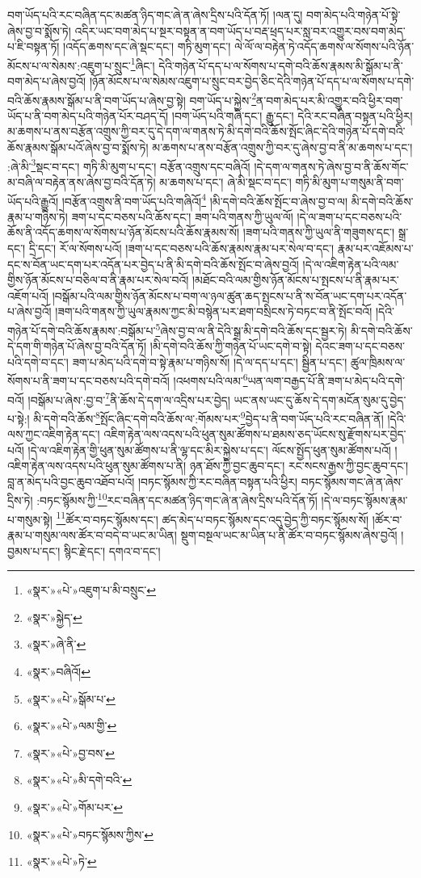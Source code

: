བག་ཡོད་པའི་རང་བཞིན་དང་མཚན་ཉིད་གང་ཞེ་ན་ཞེས་དྲིས་པའི་དོན་ཏོ། །ལན་དུ། བག་མེད་པའི་གཉེན་པོ་སྟེ་ཞེས་བྱ་བ་སྨོས་ཏེ། འདིར་ཡང་བག་མེད་པ་སྔར་བསྟན་ན་བག་ཡོད་པ་བརྡ་ཕྲད་པར་སླ་བར་འགྱུར་བས་བག་མེད་པ་ཇི་བསྟན་ཏོ། །འདོད་ཆགས་དང་ཞེ་སྡང་དང་། གཏི་མུག་དང་། ལེ་ལོ་ལ་བརྟེན་ཏེ་འདོད་ཆགས་ལ་སོགས་པའི་ཉོན་མོངས་པ་ལ་སེམས་:འཇུག་པ་སྲུང་\footnote{«སྣར་»«པེ་»འཇུག་པ་མི་བསྲུང་}ཞིང་། དེའི་གཉེན་པོ་དད་པ་ལ་སོགས་པ་དགེ་བའི་ཆོས་རྣམས་མི་སྒོམ་པ་ནི་བག་མེད་པ་ཞེས་བྱའོ། །ཉོན་མོངས་པ་ལ་སེམས་འཇུག་པ་སྲུང་བར་བྱེད་ཅིང་དེའི་གཉེན་པོ་དད་པ་ལ་སོགས་པ་དགེ་བའི་ཆོས་རྣམས་སྒོམ་པ་ནི་བག་ཡོད་པ་ཞེས་བྱ་སྟེ། བག་ཡོད་པ་སྐྱེས་\footnote{«སྣར་»སྐྱེད་}ན་བག་མེད་པར་མི་འགྱུར་བའི་ཕྱིར་བག་ཡོད་པ་ནི་བག་མེད་པའི་གཉེན་པོར་བཤད་དོ། །བག་ཡོད་པའི་གཞི་དང་། རྒྱུ་དང་། དེའི་རང་བཞིན་བསྟན་པའི་ཕྱིར། མ་ཆགས་པ་ནས་བརྩོན་འགྲུས་ཀྱི་བར་དུ་དེ་དག་ལ་གནས་ཏེ་མི་དགེ་བའི་ཆོས་སྤོང་ཞིང་དེའི་གཉེན་པོ་དགེ་བའི་ཆོས་རྣམས་སྒོམ་པའོ་ཞེས་བྱ་བ་སྨོས་ཏེ། མ་ཆགས་པ་ནས་བརྩོན་འགྲུས་ཀྱི་བར་དུ་ཞེས་བྱ་བ་ནི་མ་ཆགས་པ་དང་། :ཞེ་མི་\footnote{«སྣར་»ཞེ་ནི་}སྡང་བ་དང་། གཏི་མི་མུག་པ་དང་། བརྩོན་འགྲུས་དང་བཞིའོ། །དེ་དག་ལ་གནས་ཏེ་ཞེས་བྱ་བ་ནི་ཆོས་གོང་མ་བཞི་ལ་བརྟེན་ནས་ཞེས་བྱ་བའི་དོན་ཏེ། མ་ཆགས་པ་དང་། ཞེ་མི་སྡང་བ་དང་། གཏི་མི་མུག་པ་གསུམ་ནི་བག་ཡོད་པའི་རྒྱུའོ། །བརྩོན་འགྲུས་ནི་བག་ཡོད་པའི་གཞིའོ།\footnote{«སྣར་»བཞིའོ།} །མི་དགེ་བའི་ཆོས་སྤོང་བ་ཞེས་བྱ་བ་ལ། མི་དགེ་བའི་ཆོས་རྣམ་པ་གཉིས་ཏེ། ཟག་པ་དང་བཅས་པའི་ཆོས་དང་། ཟག་པའི་གནས་ཀྱི་ཡུལ་ལོ། །དེ་ལ་ཟག་པ་དང་བཅས་པའི་ཆོས་ནི་འདོད་ཆགས་ལ་སོགས་པ་ཉོན་མོངས་པའི་ཆོས་རྣམས་སོ། །ཟག་པའི་གནས་ཀྱི་ཡུལ་ནི་གཟུགས་དང་། སྒྲ་དང་། དྲི་དང་། རོ་ལ་སོགས་པའོ། །ཟག་པ་དང་བཅས་པའི་ཆོས་རྣམས་རྣམ་པར་སེལ་བ་དང་། རྣམ་པར་འཇོམས་པ་དང་ས་བོན་ཡང་དག་པར་འདོན་པར་བྱེད་པ་ནི་མི་དགེ་བའི་ཆོས་སྤོང་བ་ཞེས་བྱའོ། །དེ་ལ་འཇིག་རྟེན་པའི་ལམ་གྱིས་ཉོན་མོངས་པ་བཅིལ་བ་ནི་རྣམ་པར་སེལ་བའོ། །མཐོང་བའི་ལམ་གྱིས་ཉོན་མོངས་པ་སྤངས་པ་ནི་རྣམ་པར་འཇོག་པའོ། །བསྒོམ་པའི་ལམ་གྱིས་ཉོན་མོངས་པ་བག་ལ་ཉལ་ཚུན་ཆད་སྤངས་པ་ནི་ས་བོན་ཡང་དག་པར་འདོན་པ་ཞེས་བྱའོ། །ཟག་པའི་གནས་ཀྱི་ཡུལ་རྣམས་ཀྱང་མི་བསྙེན་པར་ཐག་བསྲིངས་ཏེ་བཏང་བ་ནི་སྤོང་བའོ། །དེའི་གཉེན་པོ་དགེ་བའི་ཆོས་རྣམས་:བསྒོམ་པ་\footnote{«སྣར་»«པེ་»སྒོམ་པ་}ཞེས་བྱ་བ་ལ་ནི་དེའི་སྒྲ་མི་དགེ་བའི་ཆོས་དང་སྦྱར་ཏེ། མི་དགེ་བའི་ཆོས་དེ་དག་གི་གཉེན་པོ་ཞེས་བྱ་བའི་དོན་ཏོ། །མི་དགེ་བའི་ཆོས་ཀྱི་གཉེན་པོ་ཡང་དགེ་བ་སྟེ། དེའང་ཟག་པ་དང་བཅས་པའི་དགེ་བ་དང་། ཟག་པ་མེད་པའི་དགེ་བ་སྟེ་རྣམ་པ་གཉིས་སོ། །དེ་ལ་དད་པ་དང་། སྦྱིན་པ་དང་། ཚུལ་ཁྲིམས་ལ་སོགས་པ་ནི་ཟག་པ་དང་བཅས་པའི་དགེ་བའོ། །འཕགས་པའི་ལམ་\footnote{«སྣར་»«པེ་»ལམ་གྱི་}ཡན་ལག་བརྒྱད་པོ་ནི་ཟག་པ་མེད་པའི་དགེ་བའོ། །བསྒོམ་པ་ཞེས་:བྱ་བ་\footnote{«སྣར་»«པེ་»བྱ་བས་}ནི་ཆོས་དེ་དག་ལ་འདྲིས་པར་བྱེད། ཡང་ནས་ཡང་དུ་ཆོས་དེ་དག་མངོན་སུམ་དུ་བྱེད་པ་སྟེ:། མི་དགེ་བའི་ཆོས་\footnote{«སྣར་»«པེ་»མི་དགེ་བའི་}སྤོང་ཞིང་དགེ་བའི་ཆོས་ལ་:གོམས་པར་\footnote{«སྣར་»«པེ་»གོམ་པར་}བྱེད་པ་ནི་བག་ཡོད་པའི་རང་བཞིན་ནོ། །དེའི་ལས་ཀྱང་འཇིག་རྟེན་དང་། འཇིག་རྟེན་ལས་འདས་པའི་ཕུན་སུམ་ཚོགས་པ་ཐམས་ཅད་ཡོངས་སུ་རྫོགས་པར་བྱེད་པའོ། །དེ་ལ་འཇིག་རྟེན་གྱི་ཕུན་སུམ་ཚོགས་པ་ནི་ལྷ་དང་མིར་སྐྱེས་པ་དང་། ལོངས་སྤྱོད་ཕུན་སུམ་ཚོགས་པའོ། །འཇིག་རྟེན་ལས་འདས་པའི་ཕུན་སུམ་ཚོགས་པ་ནི། ཉན་ཐོས་ཀྱི་བྱང་ཆུབ་དང་། རང་སངས་རྒྱས་ཀྱི་བྱང་ཆུབ་དང་། བླ་ན་མེད་པའི་བྱང་ཆུབ་འཐོབ་པའོ། །བཏང་སྙོམས་ཀྱི་རང་བཞིན་བསྟན་པའི་ཕྱིར། བཏང་སྙོམས་གང་ཞེ་ན་ཞེས་དྲིས་ཏེ། :བཏང་སྙོམས་ཀྱི་\footnote{«སྣར་»«པེ་»བཏང་སྙོམས་ཀྱིས་}རང་བཞིན་དང་མཚན་ཉིད་གང་ཞེ་ན་ཞེས་དྲིས་པའི་དོན་ཏོ། །དེ་ལ་བཏང་སྙོམས་རྣམ་པ་གསུམ་སྟེ། \footnote{«སྣར་»«པེ་»ཏེ་}ཚོར་བ་བཏང་སྙོམས་དང་། ཚད་མེད་པ་བཏང་སྙོམས་དང་འདུ་བྱེད་ཀྱི་བཏང་སྙོམས་སོ། །ཚོར་བ་རྣམ་པ་གསུམ་ལས་ཚོར་བ་བདེ་བ་ཡང་མ་ཡིན། སྡུག་བསྔལ་ཡང་མ་ཡིན་པ་ནི་ཚོར་བ་བཏང་སྙོམས་ཞེས་བྱའོ། །བྱམས་པ་དང་། སྙིང་རྗེ་དང་། དགའ་བ་དང་། 